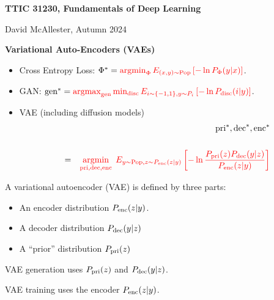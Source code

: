 

\newcommand{\bayes}{\mathrm{Bayes}}



{\Huge

  \centerline{\bf TTIC 31230, Fundamentals of Deep Learning}

\bigskip

\centerline{David McAllester, Autumn  2024}

\vfill \vfill

\centerline{\bf Variational Auto-Encoders (VAEs)}

\vfill \vfill


\begin{itemize}
\item Cross Entropy Loss: $\Phi^* = {\color{red} \operatorname*{argmin}_\Phi E_{(x,y)\sim \mathrm{Pop}}\left[-\ln P_\Phi(y|x)\right]}$.

\vfill
\item GAN: $\mathrm{gen}^* = {\color{red} \operatorname*{argmax}_{\mathrm{gen}} \min_{\mathrm{disc}} E_{i \sim \{-1,1\}, y \sim P_i}\left[-\ln P_{\mathrm{disc}}(i|y)\right]}$.

\vfill
\item VAE (including diffusion models)
\begin{eqnarray*}
& & \mathrm{pri}^*,\mathrm{dec}^*,\mathrm{enc}^* \\
\\
& = & {\color{red} \operatorname*{argmin}_{\mathrm{pri},\mathrm{dec},\mathrm{enc}}\;E_{y \sim \mathrm{Pop},z \sim P_{\mathrm{enc}}(z|y)}\left[ - \ln \frac{P_{\mathrm{pri}}(z)P_{\mathrm{dec}}(y|z)}{P_{\mathrm{enc}}(z|y)}\right]}
\end{eqnarray*}
\end{itemize}

A variational autoencoder (VAE) is defined by three parts:

\vfill
\begin{itemize}
\item An encoder distribution $P_{\mathrm{enc}}(z|y)$.

\vfill
\item A decoder distribution $P_{\mathrm{dec}}(y|z)$

\vfill
\item A ``prior'' distribution $P_{\mathrm{pri}}(z)$

\end{itemize}

\vfill
VAE generation uses $P_{\mathrm{pri}}(z)$ and $P_{\mathrm{dec}}(y|z)$.

\vfill
VAE training uses the encoder $P_{\mathrm{enc}}(z|y)$.

}
